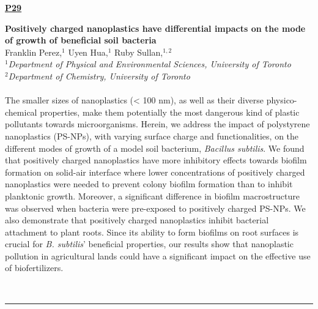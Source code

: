 \documentclass[titlepage,oneside,openany,10pt]{book}
\newenvironment{posterabs}[4] %
        {
	\begin{flushright}
                \underline{\textbf{#4}}
        \end{flushright}
        \textbf{#1}\\%
        #2\\%
        \textit{#3}\\\\%
        }
        {
        \\
        \noindent\rule{15cm}{0.5pt}%
        }
\begin{document}
\begin{posterabs}
	{Positively charged nanoplastics have differential impacts on the mode of growth of beneficial soil bacteria}
	{Franklin Perez,$^{1}$ Uyen Hua,$^{1}$ Ruby Sullan,$^{1,2}$}
	{
	$^1$Department of Physical and Environmental Sciences, University of Toronto\\
	$^2$Department of Chemistry, University of Toronto
	}
	{P29}
	The smaller sizes of nanoplastics (\textless{} 100 nm), as well as their diverse physico-chemical properties, make them potentially the most dangerous kind of plastic pollutants towards microorganisms. Herein, we address the impact of polystyrene nanoplastics (PS-NPs), with varying surface charge and functionalities, on the different modes of growth of a model soil bacterium, \emph{Bacillus subtilis}. We found that positively charged nanoplastics have more inhibitory effects towards biofilm formation on solid-air interface where lower concentrations of positively charged nanoplastics were needed to prevent colony biofilm formation than to inhibit planktonic growth. Moreover, a significant difference in biofilm macrostructure was observed when bacteria were pre-exposed to positively charged PS-NPs. We also demonstrate that positively charged nanoplastics inhibit bacterial attachment to plant roots. Since its ability to form biofilms on root surfaces is crucial for \emph{B. subtilis}' beneficial properties, our results show that nanoplastic pollution in agricultural lands could have a significant impact on the effective use of biofertilizers.
	\label{PerezF}
\end{posterabs}

\vspace{1cm}
\end{document}
